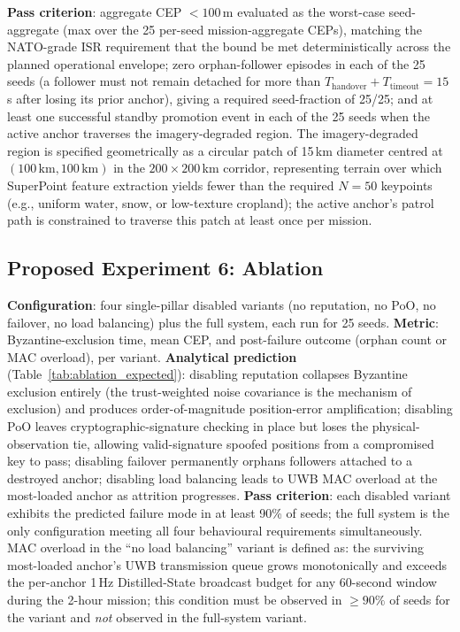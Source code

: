 \documentclass[conference,10pt]{IEEEtran}
\begin{document}
\textbf{Pass criterion}: aggregate CEP $<100$\,m evaluated as the worst-case seed-aggregate (max over the 25 per-seed mission-aggregate CEPs), matching the NATO-grade ISR requirement that the bound be met deterministically across the planned operational envelope; zero orphan-follower episodes in each of the 25 seeds (a follower must not remain detached for more than $T_\text{handover}+T_\text{timeout}=15$\,s after losing its prior anchor), giving a required seed-fraction of 25/25; and at least one successful standby promotion event in each of the 25 seeds when the active anchor traverses the imagery-degraded region. The imagery-degraded region is specified geometrically as a circular patch of 15\,km diameter centred at $(100\,\text{km}, 100\,\text{km})$ in the $200\times 200$\,km corridor, representing terrain over which SuperPoint feature extraction yields fewer than the required $N=50$ keypoints (e.g., uniform water, snow, or low-texture cropland); the active anchor's patrol path is constrained to traverse this patch at least once per mission. %

\subsection{Proposed Experiment 6: Ablation}

\textbf{Configuration}: four single-pillar disabled variants (no reputation, no PoO, no failover, no load balancing) plus the full system, each run for 25 seeds.
\textbf{Metric}: Byzantine-exclusion time, mean CEP, and post-failure outcome (orphan count or MAC overload), per variant.
\textbf{Analytical prediction} (Table~\ref{tab:ablation_expected}): disabling reputation collapses Byzantine exclusion entirely (the trust-weighted noise covariance is the mechanism of exclusion) and produces order-of-magnitude position-error amplification; disabling PoO leaves cryptographic-signature checking in place but loses the physical-observation tie, allowing valid-signature spoofed positions from a compromised key to pass; disabling failover permanently orphans followers attached to a destroyed anchor; disabling load balancing leads to UWB MAC overload at the most-loaded anchor as attrition progresses.
\textbf{Pass criterion}: each disabled variant exhibits the predicted failure mode in at least 90\% of seeds; the full system is the only configuration meeting all four behavioural requirements simultaneously. MAC overload in the ``no load balancing'' variant is defined as: the surviving most-loaded anchor's UWB transmission queue grows monotonically and exceeds the per-anchor 1\,Hz Distilled-State broadcast budget for any 60-second window during the 2-hour mission; this condition must be observed in $\geq 90\%$ of seeds for the variant and \emph{not} observed in the full-system variant. %
\end{document}
